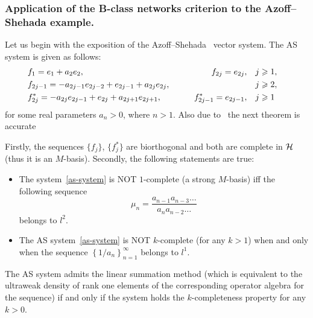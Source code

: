 \documentclass[12pt]{article}
\begin{document}
    \subsubsection{Application of the B-class networks criterion to the Azoff--Shehada example.}
      Let us begin with the exposition of the Azoff--Shehada~\cite{azoff} vector system.
      The AS system is given as follows:
      \begin{equation}
        \label{as-system}
        \begin{aligned}
          &f_1 = e_1 + a_2 e_2, \qquad &f_{2j}=e_{2j}, \quad&j \geq 1,&\\
          &f_{2j-1}=-a_{2j-1}e_{2j-2} + e_{2j-1} + a_{2j}e_{2j}, \qquad &\makebox[5em]{} \quad&j \geq 2,&\\
          &f^*_{2j}=-a_{2j}e_{2j-1}+e_{2j}+a_{2j+1}e_{2j+1}, \qquad &f^*_{2j-1}=e_{2j-1}, \quad&j \geq 1&
        \end{aligned}
      \end{equation}
        for some real parameters $a_n > 0$, where $n > 1$.
      Also due to~\cite{katavolos} the next theorem is accurate
      \begin{theorem}
        \label{thm_as}
        Firstly, the sequences $\{f_j\}$, $\{f^*_j\}$ are biorthogonal and both are complete in $\cal{H}$ (thus it is an $M$-basis).
        Secondly, the following statements are true:
        \begin{itemize}
          \item The system~\eqref{as-system} is NOT $1$-complete (a strong $M$-basis) iff the following sequence
            \begin{equation*}
              \mu_n = \frac{a_{n-1} a_{n-3} \dots}{a_{n} a_{n-2} \dots }
            \end{equation*}
              belongs to $l^2$.
          \item The AS system~\eqref{as-system} is NOT $k$-complete (for any $k > 1$) when and only when
            the sequence $\left\{1/a_n\right\}_{n=1}^\infty$ belongs to $l^1$.
        \end{itemize}
      \end{theorem}
      \begin{note}
        The AS system admits the linear summation method (which is equivalent to the
          ultraweak density of rank one elements of the corresponding operator algebra for the sequence) 
          if and only if the system holds the $k$-completeness property for any $k>0$.
      \end{note}
      
\end{document}
